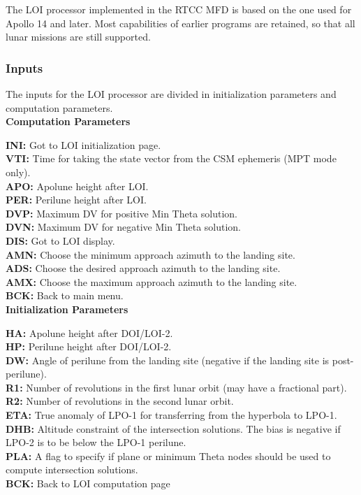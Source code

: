 \documentclass[11pt]{article} %
\begin{document}
The LOI processor implemented in the RTCC MFD is based on the one used for Apollo 14 and later. Most capabilities of earlier programs are retained, so that all lunar missions are still supported.
\newpage

\subsubsection{Inputs}

The inputs for the LOI processor are divided in initialization parameters and computation parameters.\\

\textbf{Computation Parameters}

\textbf{INI:} Got to LOI initialization page.\\
\textbf{VTI:} Time for taking the state vector from the CSM ephemeris (MPT mode only).\\
\textbf{APO:} Apolune height after LOI.\\
\textbf{PER:} Perilune height after LOI.\\
\textbf{DVP:} Maximum DV for positive Min Theta solution.\\
\textbf{DVN:} Maximum DV for negative Min Theta solution.\\
\textbf{DIS:} Got to LOI display.\\
\textbf{AMN:} Choose the minimum approach azimuth to the landing site.\\ 
\textbf{ADS:} Choose the desired approach azimuth to the landing site.\\ 
\textbf{AMX:} Choose the maximum approach azimuth to the landing site.\\
\textbf{BCK:} Back to main menu.\\

\textbf{Initialization Parameters}

\textbf{HA:} Apolune height after DOI/LOI-2.\\
\textbf{HP:} Perilune height after DOI/LOI-2.\\
\textbf{DW:} Angle of perilune from the landing site (negative if the landing site is post-perilune).\\
\textbf{R1:} Number of revolutions in the first lunar orbit (may have a fractional part).\\
\textbf{R2:} Number of revolutions in the second lunar orbit.\\
\textbf{ETA:} True anomaly of LPO-1 for transferring from the hyperbola to LPO-1.\\
\textbf{DHB:} Altitude constraint of the intersection solutions. The bias is negative if LPO-2 is to be below the LPO-1 perilune.\\
\textbf{PLA:} A flag to specify if plane or minimum Theta nodes should be used to compute intersection solutions.\\
\textbf{BCK:} Back to LOI computation page\\ 
\newpage
\end{document}
